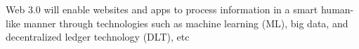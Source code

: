 Web 3.0 will enable websites and apps to process information in a smart human-like manner through technologies such as machine learning (ML), big data, and decentralized ledger technology (DLT), etc
